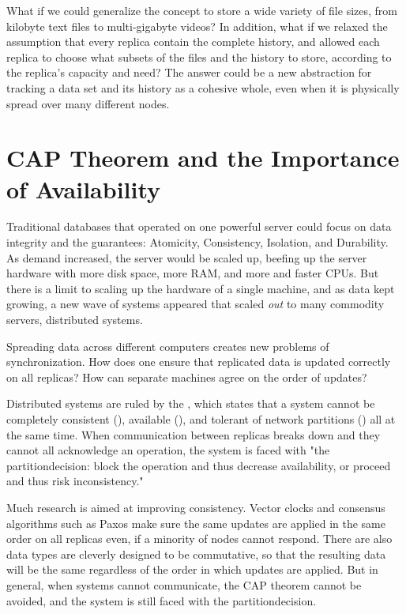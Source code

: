 What if we could generalize the 
concept to store a wide variety of file sizes, from kilobyte text files to
multi-gigabyte videos? In addition, what if we relaxed the assumption that every
replica contain the complete history, and allowed each replica to choose what
subsets of the files and the history to store, according to the replica's
capacity and need? The answer could be a new abstraction for tracking a data set
and its history as a cohesive whole, even when it is physically spread over many
different nodes.

%



\section{CAP Theorem and the Importance of Availability}

Traditional databases that operated on one powerful server could focus on data
integrity and the  guarantees: Atomicity, Consistency, Isolation,
and Durability. As demand increased, the
server would be scaled up, beefing up the server hardware with more disk space,
more RAM, and more and faster CPUs. But there is a limit to scaling up the
hardware of a single machine, and as data kept growing, a new wave of systems
appeared that scaled \emph{out} to many commodity servers, distributed systems.

Spreading data across different computers creates new problems of
synchronization. How does one ensure that replicated data is updated correctly
on all replicas? How can separate machines agree on the order of updates?

Distributed systems are ruled by the  \cite{cap_origin},
which states that a system cannot be completely consistent (),
available (), and tolerant of network partitions () all at
the same time. When communication between replicas breaks down and they cannot
all acknowledge an operation, the system is faced with "the
\gls{partitiondecision}: block the operation and thus decrease availability, or
proceed and thus risk inconsistency."\cite{cap_years_later}

Much research is aimed at improving consistency. Vector
clocks\cite{lamport_ordering} and consensus algorithms such as
Paxos\cite{paxos_made_simple,paxos_made_moderately_complex} make sure the same
updates are applied in the same order on all replicas even, if a minority of
nodes cannot respond. There are also data types are cleverly designed to be
commutative, so that the resulting data will be the same regardless of the order
in which updates are applied\cite{crdt_orig}. But in general, when systems
cannot communicate, the CAP theorem cannot be avoided\cite{cap_proof}, and the
system is still faced with the \gls{partitiondecision}.

